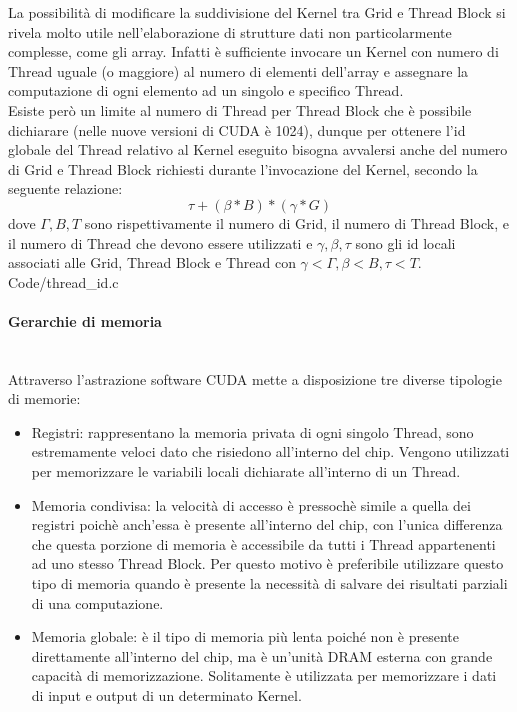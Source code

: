 La possibilità di modificare la suddivisione del Kernel tra Grid e Thread Block
si rivela molto utile nell'elaborazione di strutture dati non
particolarmente complesse, come gli array.
Infatti è sufficiente invocare un Kernel con numero di Thread
uguale (o maggiore) al numero di elementi dell'array e assegnare la
computazione di ogni elemento ad un singolo e specifico Thread.
\\
Esiste però un limite al numero di Thread per Thread Block che è possibile
dichiarare (nelle nuove versioni di CUDA è 1024), dunque per ottenere
l'id globale del Thread relativo al Kernel eseguito bisogna avvalersi anche
del numero di Grid e Thread Block richiesti durante l'invocazione del Kernel,
secondo la seguente relazione:
$$\tau + (\beta * B) * (\gamma * G)$$
dove $\Gamma, B, T$ sono rispettivamente il numero di Grid,
il numero di Thread Block, e il numero di Thread che
devono essere utilizzati e $\gamma, \beta, \tau$ sono gli id locali
associati alle Grid, Thread Block e
Thread con $\gamma < \Gamma, \beta < B, \tau < T$.
\\

    {Code/thread_id.c}

\paragraph{Gerarchie di memoria}\mbox{}
\\
Attraverso l'astrazione software CUDA mette a disposizione tre diverse
tipologie di memorie\cite{kirk2007nvidia}:

\begin{itemize}
    \item Registri: rappresentano la memoria privata di ogni singolo Thread,
        sono estremamente veloci dato che risiedono all'interno del chip.
        Vengono utilizzati per memorizzare le
        variabili locali dichiarate all'interno di un Thread.
    
    \item Memoria condivisa: la velocità di accesso è pressochè simile a quella
        dei registri poichè anch'essa è presente all'interno del chip,
        con l'unica differenza che questa porzione di memoria
        è accessibile da tutti i Thread appartenenti ad uno stesso Thread Block.
        Per questo motivo è preferibile utilizzare questo tipo di memoria
        quando è presente la necessità di salvare dei risultati parziali
        di una computazione.

    \item Memoria globale: è il tipo di memoria più lenta poiché non è presente
        direttamente all'interno del chip, ma è un'unità DRAM esterna con grande
        capacità di memorizzazione. Solitamente è utilizzata per
        memorizzare i dati di input e output di un determinato Kernel.
\end{itemize}

